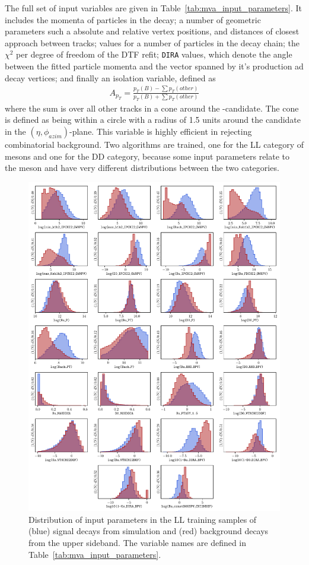 


The full set of input variables are given in Table~\ref{tab:mva_input_parameters}. It includes the momenta of particles in the decay; a number of geometric parameters such a absolute and relative vertex positions, and distances of closest approach between tracks; \ipchisq values for a number of particles in the decay chain; the $\chi^2$ per degree of freedom of the DTF refit; \texttt{DIRA} values, which denote the angle between the fitted particle momenta and the vector spanned by it's production ad decay vertices; and finally an isolation variable, defined as
\begin{align}
    A_{p_T} = \frac{p_T(B)-\sum p_T(other)}{p_T(B)+\sum p_T(other)}
\end{align}
where the sum is over all other tracks in a cone around the \B-candidate. The cone is defined as being within a circle with a radius of 1.5 units around the \B candidate in the $(\eta, \phi_{azim})$-plane. This variable is highly efficient in rejecting combinatorial background.
Two algorithms are trained, one for the LL category of \KS mesons and one for the DD category, because some input parameters relate to the \KS meson and have very different distributions between the two categories. 


\begin{figure}[p!]
    \centering
    \includegraphics[width=0.95\columnwidth]{figures/analysis/input_param_LL.pdf}
    \caption{Distribution of input parameters in the LL training samples of (blue) signal decays from simulation and (red) background decays from the upper \B sideband. The variable names are defined in Table~\ref{tab:mva_input_parameters}.}
    \label{fig:input_variables_LL}
\end{figure}

